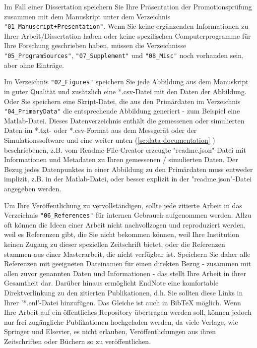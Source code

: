 Im Fall einer Dissertation speichern Sie Ihre Präsentation der Promotionsprüfung
zusammen mit dem Manuskript unter dem Verzeichnis
\texttt{"01\_Manuscript+Presentation"}. Wenn Sie keine ergänzenden Informationen
zu Ihrer Arbeit/Dissertation haben oder keine spezifischen Computerprogramme für
Ihre Forschung geschrieben haben, müssen die Verzeichnisse
\texttt{"05\_ProgramSources"}, \texttt{"07\_Supplement"} und \texttt{"08\_Misc"}
noch vorhanden sein, aber ohne Einträge.

Im Verzeichnis \texttt{"02\_Figures"} speichern Sie jede Abbildung aus dem Manuskript in guter Qualität und zusätzlich eine *.csv-Datei mit den Daten der Abbildung. Oder Sie speichern eine Skript-Datei, die aus den Primärdaten im Verzeichnis \texttt{"04\_PrimaryData"} die entsprechende Abbildung generiert - zum Beispiel eine Matlab-Datei. Dieses Datenverzeichnis enthält die gemessenen oder simulierten Daten im *.txt- oder *.csv-Format aus dem Messgerät oder der Simulationssoftware und eine weiter unten (\ref{sc:data-documentation}  ) beschriebenen, z.B. vom Readme-File-Creator erzeugte "readme.json"-Datei mit Informationen und Metadaten zu Ihren gemessenen / simulierten Daten. Der Bezug jedes Datenpunktes in einer Abbildung zu den Primärdaten muss entweder implizit, z.B. in der Matlab-Datei, oder besser explizit in der "readme.json"-Datei angegeben werden.

Um Ihre Veröffentlichung zu vervollständigen, sollte jede zitierte Arbeit in das
Verzeichnis \texttt{"06\_References"} für internen Gebrauch aufgenommen werden.
Allzu oft können die Ideen einer Arbeit nicht nachvollzogen und reproduziert
werden, weil es Referenzen gibt, die Sie nicht bekommen können, weil Ihre
Institution keinen Zugang zu dieser speziellen Zeitschrift bietet, oder die
Referenzen stammen aus einer Masterarbeit, die nicht verfügbar ist. Speichern
Sie daher alle Referenzen mit geeigneten Dateinamen für einen direkten Bezug -
zusammen mit allen zuvor genannten Daten und Informationen - das stellt Ihre
Arbeit in ihrer Gesamtheit dar. Darüber hinaus ermöglicht EndNote eine
komfortable Direktverlinkung zu den zitierten Publikationen, d.h. Sie sollten
diese Links in Ihrer '*.enl'-Datei hinzufügen. Das Gleiche ist auch in BibTeX
möglich. Wenn Ihre Arbeit auf ein öffentliches Repository übertragen werden
soll, können jedoch nur frei zugängliche Publikationen hochgeladen werden, da
viele Verlage, wie Springer und Elsevier, es nicht erlauben, Veröffentlichungen
aus ihren Zeitschriften oder Büchern so zu veröffentlichen.

